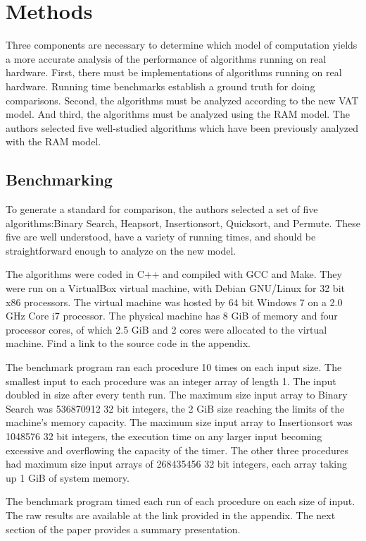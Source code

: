 \section{Methods}
  
  Three components are necessary to determine which model of computation yields
  a more accurate analysis of the performance of algorithms running on real
  hardware. First, there must be implementations of algorithms running on real
  hardware. Running time benchmarks establish a ground truth for doing
  comparisons. Second, the algorithms must be analyzed according to the new VAT
  model. And third, the algorithms must be analyzed using the RAM model. The 
  authors selected five well-studied algorithms which have been previously
  analyzed with the RAM model.
  
  \subsection{Benchmarking}
  
  To generate a standard for comparison, the authors selected a set of five
  algorithms:Binary Search, Heapsort, Insertionsort, Quicksort, and Permute. 
  These five are well understood, have a variety of running times, and should
  be straightforward enough to analyze on the new model.
  
  The algorithms were coded in C++ and compiled with GCC and Make. They were
  run on a VirtualBox virtual machine, with Debian GNU/Linux for 32 bit
  x86 processors. The virtual machine was hosted by 64 bit Windows 7 on a 2.0
  GHz Core i7 processor. The physical machine has 8 GiB of memory and four
  processor cores, of which 2.5 GiB and 2 cores were allocated to the virtual
  machine. Find a link to the source code in the appendix.
  
  The benchmark program ran each procedure 10 times on each input size. The 
  smallest input to each procedure was an integer array of length 1. The input
  doubled in size after every tenth run. The maximum size input array to 
  Binary Search was 536870912 32 bit integers, the 2 GiB size reaching the 
  limits of the machine's memory capacity. The maximum size input array to 
  Insertionsort was 1048576 32 bit integers, the execution time on any larger
  input becoming excessive and overflowing the capacity of the timer. The other
  three procedures had maximum size input arrays of 268435456 32 bit integers,
  each array taking up 1 GiB of system memory.
  
  The benchmark program timed each run of each procedure on each size of input.
  The raw results are available at the link provided in the appendix. The next
  section of the paper provides a summary presentation.
